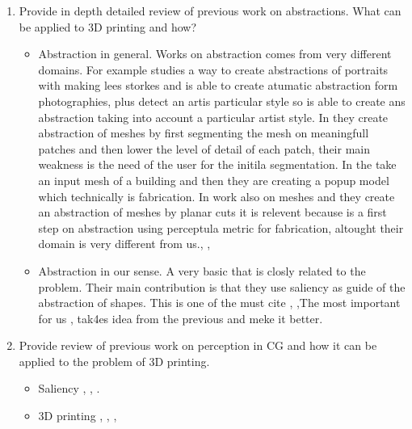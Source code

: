 \begin{enumerate}
	\item Provide in depth detailed review of previous work on abstractions. What can be applied to 3D printing and how?
	
	\begin{itemize}
		\item Abstraction in general. Works on abstraction comes from very different domains. For example \cite{Berger2013} studies a way to create abstractions of portraits with making lees  storkes and is able to create atumatic abstraction form photographies, plus detect an artis particular style so is able to create ans abstraction taking into account a particular artist style.
		In \cite{DeGoes2011} they create abstraction of meshes by first segmenting the mesh on meaningfull patches and then lower the level of detail of each patch, their main weakness is the need of the user for the initila segmentation. In \cite{Li2010} the take an input mesh of a building and then they are creating a popup model which technically is fabrication. In \cite{Hildebrand2012} work also on meshes and they create an abstraction of meshes by planar cuts it is relevent because is a first step on abstraction using perceptula metric for fabrication, altought their domain is very different from us., \cite{McCrae2011}, 
		\item Abstraction in our sense. A very basic \cite{Yang2009} that is closly related to the problem. Their main contribution is that they use saliency as guide of the abstraction of shapes. This is one of the must cite \cite{Mehra2009}, ,The most important for us \cite{Yumer2012}, tak4es idea from the previous and meke it better.
	\end{itemize}

  \item Provide review of previous work on perception in CG and how it can be applied to the problem of 3D printing.
	
	\begin{itemize}
		\item Saliency \cite{Nan2011}, \cite{Wu2013}, \cite{Feixas2009}. \cite{Kim2010}
		\item 3D printing \cite{Echevarria2014}, \cite{Wang2015} \cite{Stava2012}, \cite{Torkhani2015},
	\end{itemize}


\end{enumerate}
